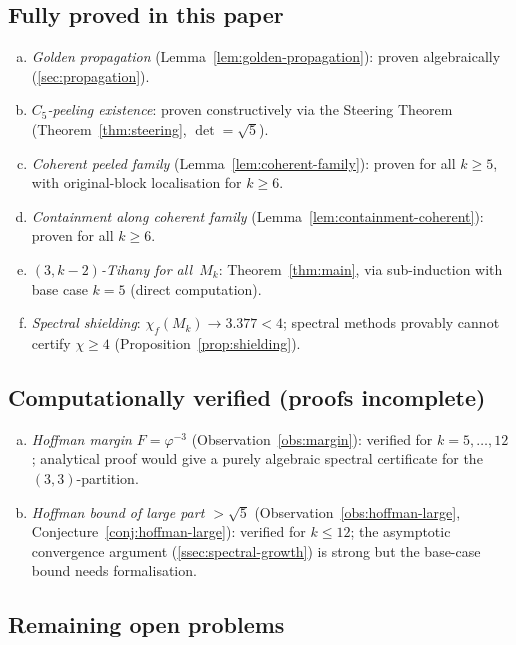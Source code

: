 \documentclass[11pt,a4paper]{amsart}
\theoremstyle{plain}
\theoremstyle{definition}
\theoremstyle{remark}
\newcommand{\vp}{\varphi}
\newcommand{\chr}{\chi}
\begin{document}
\subsection{Fully proved in this paper}

\begin{enumerate}[(a)]
\item \emph{Golden propagation} (Lemma~\ref{lem:golden-propagation}): proven
  algebraically (\cref{sec:propagation}).
\item \emph{$C_5$-peeling existence}: proven constructively via the Steering
  Theorem (Theorem~\ref{thm:steering}, $\det = \sqrt{5}$).
\item \emph{Coherent peeled family} (Lemma~\ref{lem:coherent-family}): proven
  for all $k \geq 5$, with original-block localisation for $k \geq 6$.
\item \emph{Containment along coherent family}
  (Lemma~\ref{lem:containment-coherent}): proven for all $k \geq 6$.
\item \emph{$(3,k{-}2)$-Tihany for all~$M_k$}: Theorem~\ref{thm:main}, via
  sub-induction with base case $k = 5$ (direct computation).
\item \emph{Spectral shielding}: $\chr_f(M_k) \to 3.377 < 4$; spectral
  methods provably cannot certify $\chr \geq 4$ (Proposition~\ref{prop:shielding}).
\end{enumerate}

\subsection{Computationally verified (proofs incomplete)}

\begin{enumerate}[(a)]
\item \emph{Hoffman margin $F = \vp^{-3}$} (Observation~\ref{obs:margin}): verified for
  $k = 5,\ldots,12$; analytical proof would give a purely algebraic spectral
  certificate for the $(3,3)$-partition.
\item \emph{Hoffman bound of large part $> \sqrt{5}$}
  (Observation~\ref{obs:hoffman-large}, Conjecture~\ref{conj:hoffman-large}): verified for $k \leq 12$; the asymptotic
  convergence argument (\cref{ssec:spectral-growth}) is strong but the
  base-case bound needs formalisation.
\end{enumerate}

\subsection{Remaining open problems}
\end{document}
